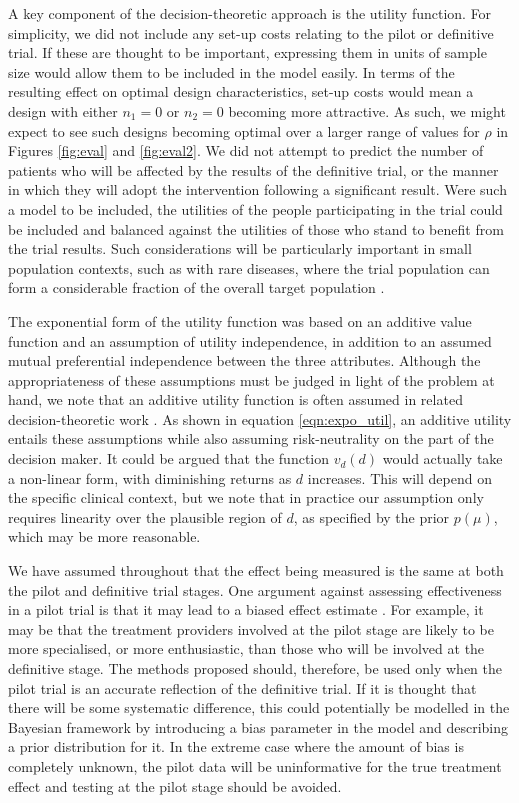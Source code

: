 \documentclass[sagev, Crown]{sagej} %
\begin{document}
A key component of the decision-theoretic approach is the utility function. For simplicity, we did not include any set-up costs relating to the pilot or definitive trial. If these are thought to be important, expressing them in units of sample size would allow them to be included in the model easily. In terms of the resulting effect on optimal design characteristics, set-up costs would mean a design with either $n_1 = 0 $ or $n_2 = 0$ becoming more attractive. As such, we might expect to see such designs becoming optimal over a larger range of values for $\rho$ in Figures \ref{fig:eval} and \ref{fig:eval2}. We did not attempt to predict the number of patients who will be affected by the results of the definitive trial, or the manner in which they will adopt the intervention following a significant result. Were such a model to be included, the utilities of the people participating in the trial could be included and balanced against the utilities of those who stand to benefit from the trial results. Such considerations will be particularly important in small population contexts, such as with rare diseases, where the trial population can form a considerable fraction of the overall target population \cite{Pearce2018}. 

The exponential form of the utility function was based on an additive value function and an assumption of utility independence, in addition to an assumed mutual preferential independence between the three attributes. Although the appropriateness of these assumptions must be judged in light of the problem at hand, we note that an additive utility function is often assumed in related decision-theoretic work \cite{Gittins2000a, Willan2005, Kikuchi2009, Hee2012, Pearce2018} . As shown in equation \ref{eqn:expo_util}, an additive utility entails these assumptions while also assuming risk-neutrality on the part of the decision maker. It could be argued that the function $v_d(d)$ would actually take a non-linear form, with diminishing returns as $d$ increases. This will depend on the specific clinical context, but we note that in practice our assumption only requires linearity over the plausible region of $d$, as specified by the prior $p(\mu)$, which may be more reasonable. 

We have assumed throughout that the effect being measured is the same at both the pilot and definitive trial stages. One argument against assessing effectiveness in a pilot trial is that it may lead to a biased effect estimate \cite{Sim2019}. For example, it may be that the treatment providers involved at the pilot stage are likely to be more specialised, or more enthusiastic, than those who will be involved at the definitive stage. The methods proposed should, therefore, be used only when the pilot trial is an accurate reflection of the definitive trial. If it is thought that there will be some systematic difference, this could potentially be modelled in the Bayesian framework by introducing a bias parameter in the model and describing a prior distribution for it. In the extreme case where the amount of bias is completely unknown, the pilot data will be uninformative for the true treatment effect and testing at the pilot stage should be avoided.
\end{document}
